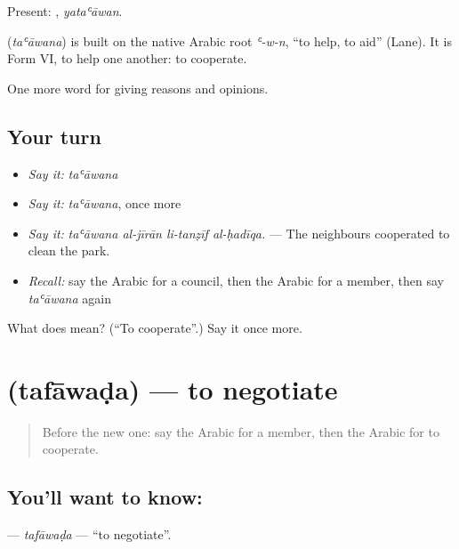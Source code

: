 Present: , \emph{yataʿāwan}.

\begin{cousinweb}
\textbf{} (\emph{taʿāwana}) is built on the native Arabic root \emph{ʿ-w-n}, \textquotedblleft{}to help, to aid\textquotedblright{} (Lane). It is Form VI, to help one another: to cooperate.
\end{cousinweb}

\begin{grammarlens}[title={What you've built}]
One more word for giving reasons and opinions.
\end{grammarlens}

\subsection*{Your turn}
\begin{itemize}
\raggedright
  \item \emph{Say it:} \emph{taʿāwana}
  \item \emph{Say it:} \emph{taʿāwana}, once more
  \item \emph{Say it:} \emph{taʿāwana al-jīrān li-tanẓīf al-ḥadīqa.} — The neighbours cooperated to clean the park.
  \item \emph{Recall:} say the Arabic for a council, then the Arabic for a member, then say \emph{taʿāwana} again
\end{itemize}

\begin{tcolorbox}[breakable,colback=teal!4,colframe=teal!35!black,title={Before you move on}]
What does  mean? (\textquotedblleft{}To cooperate\textquotedblright{}.) Say it once more.
\end{tcolorbox}
\section[\texorpdfstring{\ar{تفاوض} (tafāwaḍa)}{تفاوض (tafāwaḍa)}]{ (tafāwaḍa) — to negotiate}

\label{lesson:AR-C386-tafawada}



\begin{quote}
Before the new one: say the Arabic for a member, then the Arabic for to cooperate.
\end{quote}

\subsection*{You'll want to know: }
\textbf{} — \emph{tafāwaḍa} — \textquotedblleft{}to negotiate\textquotedblright{}.

